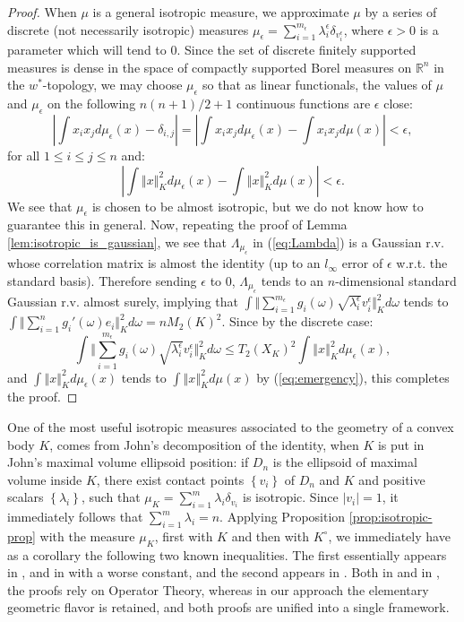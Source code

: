 \documentclass[12pt,oneside]{amsart}
\theoremstyle{definition}
\theoremstyle{remark}
\theoremstyle{proof}
\numberwithin{equation}{section}
\newcommand{\norm}[1]{\left\Vert#1\right\Vert}
\newcommand{\snorm}[1]{\Vert#1\Vert}
\newcommand{\abs}[1]{\left\vert#1\right\vert}
\newcommand{\set}[1]{\left\{#1\right\}}
\newcommand{\Real}{\mathbb{R}}
\begin{document}
\begin{proof}
When $\mu$ is a general isotropic measure, we approximate $\mu$
by a series of discrete (not necessarily isotropic) measures
$\mu_\epsilon = \sum_{i=1}^{m_\epsilon} \lambda^\epsilon_i
\delta_{v^\epsilon_i}$, where $\epsilon>0$ is a parameter which
will tend to 0. Since the set of discrete finitely supported
measures is dense in the space of compactly supported Borel
measures on $\Real^n$ in the $w^*$-topology, we may choose
$\mu_\epsilon$ so that as linear functionals, the values of $\mu$
and $\mu_\epsilon$ on the following $n(n+1)/2 + 1$ continuous
functions are $\epsilon$ close:
\[
\abs{\int x_i x_j d\mu_\epsilon(x) - \delta_{i,j}} = \abs{\int x_i
x_j d\mu_\epsilon(x)  - \int x_i x_j d\mu(x)} < \epsilon, \] for
all $1\leq i \leq j \leq n$ and:
\begin{equation} \label{eq:emergency}
\abs{\int \norm{x}^2_K d\mu_\epsilon(x)  - \int \norm{x}^2_K
d\mu(x)} < \epsilon.
\end{equation}
We see that $\mu_\epsilon$ is chosen to be almost isotropic, but
we do not know how to guarantee this in general. Now, repeating
the proof of Lemma \ref{lem:isotropic_is_gaussian}, we see that
$\Lambda_{\mu_\epsilon}$ in (\ref{eq:Lambda}) is a Gaussian r.v.
whose correlation matrix is almost the identity (up to an
$l_\infty$ error of $\epsilon$ w.r.t. the standard basis).
Therefore sending $\epsilon$ to 0, $\Lambda_{\mu_\epsilon}$ tends
to an $n$-dimensional standard Gaussian r.v. almost surely,
implying that $\int \snorm{\sum_{i=1}^{m_\epsilon} g_i(\omega)
\sqrt{\lambda^\epsilon_i} v^\epsilon_i}^2_K d\omega$ tends to
$\int \snorm{\sum_{i=1}^n g_i'(\omega) e_i}^2_K d\omega = n
M_2(K)^2$. Since by the discrete case:
\[
\int \snorm{\sum_{i=1}^{m_\epsilon} g_i(\omega)
\sqrt{\lambda^\epsilon_i} v^\epsilon_i}^2_K d\omega \leq
T_2(X_K)^2 \int\norm{x}^2_K d\mu_\epsilon(x),
\]
and $\int\norm{x}^2_K d\mu_\epsilon(x)$ tends to $\int\norm{x}^2_K
d\mu(x)$ by (\ref{eq:emergency}), this completes the proof.
\end{proof}

One of the most useful isotropic measures associated to the
geometry of a convex body $K$, comes from John's decomposition of
the identity, when $K$ is put in John's maximal volume ellipsoid
position: if $D_n$ is the ellipsoid of maximal volume inside $K$,
there exist contact points $\set{v_i}$ of $D_n$ and $K$ and
positive scalars $\set{\lambda_i}$, such that $\mu_K =
\sum_{i=1}^m \lambda_i \delta_{v_i}$ is isotropic. Since
$\abs{v_i}=1$, it immediately follows that $\sum_{i=1}^m
\lambda_i = n$. Applying Proposition \ref{prop:isotropic-prop}
with the measure $\mu_K$, first with $K$ and then with $K^\circ$,
we immediately have as a corollary the following two known
inequalities. The first essentially appears in
\cite{Maurey-Report}, and in \cite{Milman-Schechtman-Book} with a
worse constant, and the second appears in
\cite{Davis-etal-Lemma}. Both in \cite{Davis-etal-Lemma} and in
\cite{Maurey-Report}, the proofs rely on Operator Theory, whereas
in our approach the elementary geometric flavor is retained, and
both proofs are unified into a single framework.
\end{document}
